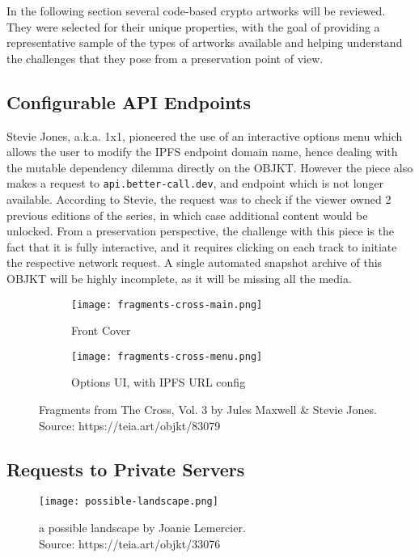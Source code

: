 In the following section several code-based crypto artworks will be reviewed. They were selected for their unique properties, with the goal of providing a representative sample of the types of artworks available and helping understand the challenges that they pose from a preservation point of view.

\subsection{Configurable API Endpoints}

Stevie Jones, a.k.a. 1x1, pioneered the use of an interactive options menu which allows the user to modify the IPFS endpoint domain name, hence dealing with the mutable dependency dilemma directly on the OBJKT. However the piece also makes a request to \texttt{api.better-call.dev}, and endpoint which is not longer available. According to Stevie, the request was to check if the viewer owned 2 previous editions of the series, in which case additional content would be unlocked. From a preservation perspective, the challenge with this piece is the fact that it is fully interactive, and it requires clicking on each track to initiate the respective network request. A single automated snapshot archive of this OBJKT will be highly incomplete, as it will be missing all the media.

\begin{figure}[H]
  \centering
  \captionsetup{justification=centering}
  \begin{subfigure}[b]{0.45\textwidth}
    \centering
    \texttt{[image: fragments-cross-main.png]}
    \caption{Front Cover}
    \label{fig:vdp1}
  \end{subfigure}
  \hfill
  \begin{subfigure}[b]{0.45\textwidth}
    \centering
    \texttt{[image: fragments-cross-menu.png]}
    \caption{Options UI, with IPFS URL config}
    \label{fig:vdp2}
  \end{subfigure}
  \caption{Fragments from The Cross, Vol. 3 by Jules Maxwell \& Stevie Jones. \\ Source: https://teia.art/objkt/83079}
  \label{fig:vdp-examples}
\end{figure}


\subsection{Requests to Private Servers}

\begin{figure}[h]
    \centering
    \captionsetup{justification=centering}
    \texttt{[image: possible-landscape.png]}
    \captionsetup{justification=centering}
    \caption[a possible landscape by Joanie Lemercier]{a possible landscape by Joanie Lemercier. \\ Source: https://teia.art/objkt/33076}
    \label{fig:vdp}
\end{figure}

